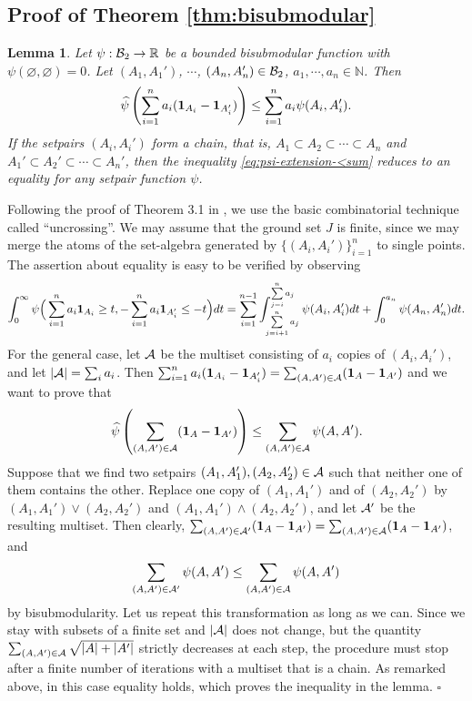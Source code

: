 \documentclass[12pt,a4paper]{article}
\newtheorem{lemma}[theorem]{Lemma}
\newenvironment{proof}{\medskip\noindent{\bf Proof. }}{\hfill$\square$\medskip}
\begin{document}
\subsection{Proof of Theorem \ref{thm:bisubmodular}}

\begin{lemma}\label{lem:for-Thm-equ}
Let $\psi:\mathcal{B}_2\to\mathbb{R}$ be a bounded bisubmodular function with $\psi(\varnothing,\varnothing)=0$. Let $(A_1,A_1')$, $\cdots$, $(A_n,A_n')\in \mathcal{B}_2$, $a_1,\cdots,a_n\in \mathbb{N}$. Then
\begin{equation}
\label{eq:psi-extension-<sum}
\widehat{\psi}\left(\sum_{i=1}^n a_i({\bf1}_{A_i}-{\bf1}_{A_i'})\right)\le \sum_{i=1}^n a_i\psi(A_i,A_i').    
\end{equation}
If the setpairs $(A_i,A_i')$ 
form a chain, that is, $A_1\subset A_2\subset\cdots\subset A_n$ and $A_1'\subset A_2'\subset\cdots\subset A_n'$, then the inequality \eqref{eq:psi-extension-<sum} reduces to an equality for any setpair function $\psi$. 
\end{lemma}

\begin{proof}Following the proof of Theorem 3.1 in \cite{Lovasz25}, we use the basic combinatorial technique
called “uncrossing”. 
We may assume that the ground set $J$ is finite, since we may merge the atoms
of the set-algebra generated by $\{(A_i,A_i')\}_{i=1}^n$ to single points. The assertion about
equality is easy to be verified by observing 
\[\int_0^{%
\infty}\psi\Big(\sum_{i=1}^n a_i{\bf1}_{A_i}\ge t,-\sum_{i=1}^n a_i{\bf1}_{A_i'}\le- t\Big)dt=\sum\limits_{i=1}^{n-1}\int^{\sum\limits_{j=i}^na_j}_{\sum\limits_{j=i+1}^na_j}\psi(A_i,A_i')dt+\int_0^{a_n}\psi(A_n,A_n')dt.\]%
For the
general case, let $\mathcal{A}$ be the multiset consisting of $a_i$ copies of $(A_i,A_i')$, and let $|\mathcal{A}|=\sum_ia_i$. Then $\sum_{i=1}^n a_i({\bf1}_{A_i}-{\bf1}_{A_i'})=\sum_{(A,A')\in \mathcal{A}}({\bf1}_A-{\bf1}_{A'})$ and we want to prove that $$\widehat{\psi}\left(\sum_{(A,A')\in \mathcal{A}}({\bf1}_A-{\bf1}_{A'})\right)\le \sum_{(A,A')\in \mathcal{A}} \psi(A,A').$$
Suppose that we find two setpairs $(A_1,A_1'),(A_2,A_2')\in\mathcal{A}$ such that neither one of them
contains the other. Replace one copy of $(A_1,A_1')$ and of $(A_2,A_2')$ by $(A_1,A_1')\vee (A_2,A_2')$ and $(A_1,A_1')\wedge (A_2,A_2')$, and let $\mathcal{A}'$ be the resulting multiset. Then clearly, $\sum_{(A,A')\in \mathcal{A}'}({\bf1}_A-{\bf1}_{A'})=\sum_{(A,A')\in \mathcal{A}}({\bf1}_A-{\bf1}_{A'})$, and 
$$\sum_{(A,A')\in \mathcal{A}'} \psi(A,A')\le \sum_{(A,A')\in \mathcal{A}} \psi(A,A') $$
by bisubmodularity. Let us repeat this transformation as long as we can. Since we stay with subsets of a finite set and $|\mathcal{A}|$ does not change, but the quantity $\sum_{(A,A')\in\mathcal{A}}\sqrt{|A|+|A'|}$ strictly decreases at each step, the procedure must stop after a finite
number of iterations with a multiset that is a chain. As remarked above, in this case equality holds, which proves the inequality in the lemma. 
\end{proof}
\end{document}

